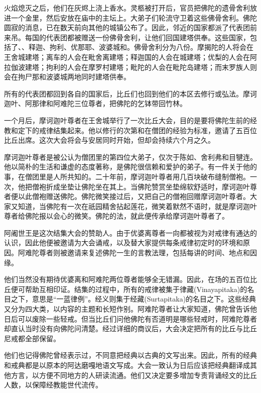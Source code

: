 \documentclass[12pt,twoside,openany]{book}
\begin{document}
火焰熄灭之后，他们在灰烬上浇上香水。灵柩被打开后，官员把佛陀的遗骨舍利放进一个金里，然后安放在庙中的主坛上。大弟子们轮流守卫着这些佛骨舍利。佛陀圆寂的消息，已在数天前向其他的城镇公布了。因此，邻近的国家都派了代表团前来吊。每国的代表团都被赠送一份佛骨舍利，让他们回国建塔供奉。这些国家，包括了、、释迦、拘利、优那耶、波婆城和。佛骨舍利分为八份。摩揭陀的人将会在王舍城建塔；离车的人会在毗舍离建塔；释迦国的人会在城建塔；优梨的人会在阿拉伽波建塔；拘利的人会在摩罗村建塔；毗陀的人会在毗陀岛建塔；而末罗族人则会在拘尸那和波婆城两地同时建塔供奉。

所有的代表团都回到各自的国家后，比丘们也回到他们的本区去修行或弘法。摩诃迦叶、阿那律和阿难陀三位尊者，把佛陀的乞钵带回竹林。

一个月后，摩诃迦叶尊者在王舍城举行了一次比丘大会，目的是要将佛陀生前的经教和定下的戒律结集起来。他以修行的次第和在僧团的经验为标准，邀请了五百位比丘出席。这次大会将会与安居同时开始，但却会持续六个月之久。

摩诃迦叶尊者是被公认为僧团里的第四位大弟子，仅次于陈如、舍利弗和目犍连。他以简朴的生活和谦虚的态度著称，是佛陀很信赖和爱护的弟子。有一件关于他的事，在僧团里是人所共知的。二十年前，摩诃迦叶尊者用几百块破布缝制僧袍。一次，他把僧袍折成坐垫让佛陀坐在其上。当佛陀赞赏坐垫绵软舒适时，摩诃迦叶尊者便以此僧袍赠送佛陀。佛陀微笑接过后，又把自己的僧袍回赠摩诃迦叶尊者。大家又知道，当佛陀有一次在祇园精舍拈起莲花，微笑着默然不语时，就是摩诃迦叶尊者给佛陀报以会心的微笑。佛陀的法，就此便传承给摩诃迦叶尊者了。

阿阇世王是这次结集大会的赞助人。由于优婆离尊者一向都被视为对戒律有通达的认识，因此他便被邀请为大会诵戒，以及替大家提供每条戒律初定时的环境和原因。阿难陀尊者则被邀请来复述佛陀一生的言教法理，包括每讲的时间、地点和因缘。

他们当然没有期待优婆离和阿难陀两位尊者能够全无错漏。因此，在场的五百位比丘便可帮助互相印证。结集的过程中，所有的戒律被集于律藏(Vinayapitaka)的名目之下，意思是“一蓝律例”。经义则集于经藏(Surtapitaka)的名目之下。这些经典又分为四大类，以内容的主题和长短作别。阿难陀尊者让大家知道，佛陀曾告诉他日后可以废除一些轻戒。但当比丘们问他佛陀有否道明是哪些轻戒时，阿难陀尊者却直认当时没有向佛陀问清楚。经过详细的商议后，大会决定把所有的比丘与比丘尼戒都全部保留。

他们也记得佛陀曾经表示过，不同意把经典以古典的文写出来。因此，所有的经典和戒典都是以原本的阿达磨嘎地语文写成。大会一致认为日后应该把经典翻译成其他方言，以方便不同地方的人研读流通。他们又决定要多增加专责背诵经文的比丘人数，以保障经教能世代流传。
\end{document}
